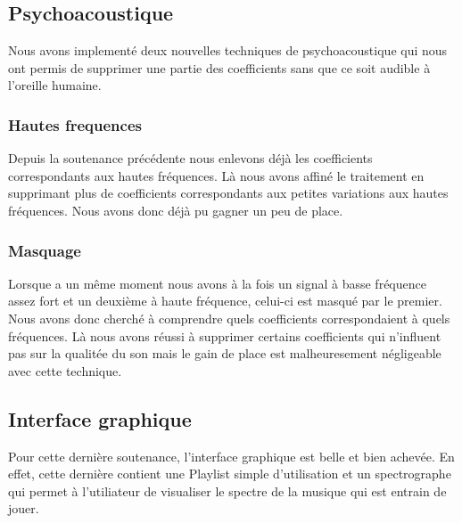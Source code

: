 \documentclass[a4paper,12pt]{report}
\begin{document}
\subsection{Psychoacoustique}
Nous avons implement\'e deux nouvelles techniques de psychoacoustique
qui nous ont permis de supprimer une partie des coefficients sans que ce
soit audible \`a l'oreille humaine.
\subsubsection{Hautes frequences}
Depuis la soutenance pr\'ec\'edente nous enlevons d\'ej\`a les coefficients
correspondants aux hautes fr\'equences. L\`a nous avons affin\'e le
traitement en supprimant plus de coefficients correspondants aux
petites variations aux hautes fr\'equences. Nous avons donc d\'ej\`a pu
gagner un peu de place.
\subsubsection{Masquage}
Lorsque a un m\^eme moment nous avons \`a la fois un signal \`a basse
fr\'equence assez fort et un deuxi\`eme \`a haute fr\'equence, celui-ci est
masqu\'e par le premier. Nous avons donc cherch\'e \`a comprendre quels
coefficients correspondaient \`a quels fr\'equences. L\`a nous avons r\'eussi
\`a supprimer certains coefficients qui n'influent pas sur la qualit\'ee du
son mais le gain de place est malheuresement n\'egligeable avec cette technique.
\subsection{Interface graphique}
Pour cette dernière soutenance, l'interface graphique est belle et bien achevée.
En effet, cette dernière contient une Playlist simple d'utilisation et un
spectrographe qui permet à l'utiliateur de visualiser le spectre de la musique
qui est entrain de jouer.
\end{document}
